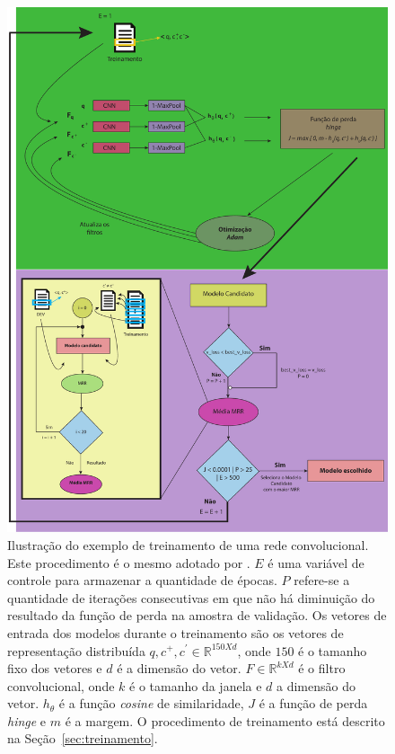 \begin{figure}[p]
\centering
\includegraphics[height=1.3\textwidth]{figuras/cap-experimento/evaluation_process.pdf}
\caption[Ilustração do exemplo de treinamento de uma rede convolucional.]{Ilustração do exemplo de treinamento de uma rede convolucional. Este procedimento é o mesmo adotado por \cite{iyer-etal-2016-summarizing}. $E$ é uma variável de controle para armazenar a quantidade de épocas. $P$ refere-se a quantidade de iterações consecutivas em que não há diminuição do resultado da função de perda na amostra de validação. Os vetores de entrada dos modelos durante o treinamento são os vetores de representação distribuída $q, c^{+}, c^{'} \in \mathbb{R}^{150 X d}$, onde $150$ é o tamanho fixo dos vetores e $d$ é a dimensão do vetor. $F \in \mathbb{R}^{k X d}$ é o filtro convolucional, onde $k$ é o tamanho da janela e $d$ a dimensão do vetor. $h_{\theta}$ é a função \textit{cosine} de similaridade, $J$ é a função de perda \textit{hinge} e $m$ é a margem. O procedimento de treinamento está descrito na Seção~\ref{sec:treinamento}.}
\label{fig:evaluation-process}
\end{figure}

